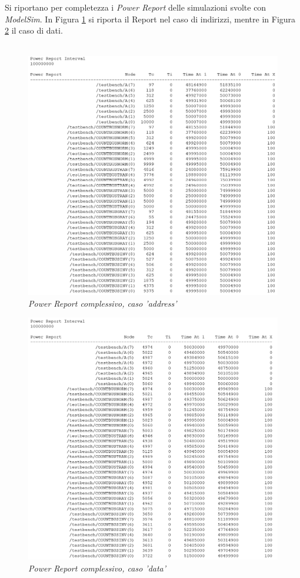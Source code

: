 \newpage
\noindent Si riportano per completezza i \textit{Power Report} delle simulazioni svolte con \textit{ModelSim}. In Figura \ref{address} si riporta il Report nel caso di indirizzi, mentre in Figura \ref{data} il caso di dati.
\\
\\
\begin{figure}[!htb]
	\centering
	\includegraphics[scale=1]{immagini/address_report_tecniche}
	\caption{\textit{Power Report complessivo, caso 'address'}}
	\label{address}
\end{figure}
\newpage
\begin{figure}[!htb]
	\centering
	\includegraphics[scale=0.8]{immagini/data_report_tecniche}
	\caption{\textit{Power Report complessivo, caso 'data'}}
	\label{data}
\end{figure}
